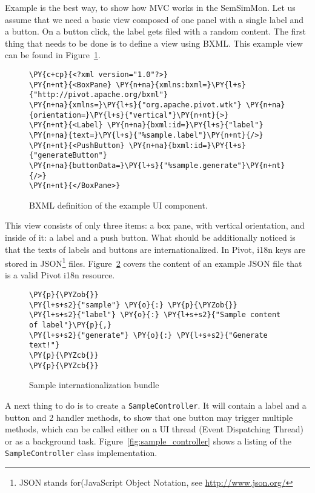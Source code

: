 Example is the best way, to show how MVC works in the SemSimMon. Let us assume that we need a basic view composed of one panel with a single label and a button. On a button click, the label gets filed with a random content. The first thing that needs to be done is to define a view using BXML. This example view can be found in Figure~\ref{fig:sample_view}.

\begin{figure}[ht]
\centering
\begin{Verbatim}[commandchars=\\\{\},frame=single,framerule=0.2pt] 
\PY{c+cp}{<?xml version="1.0"?>}
\PY{n+nt}{<BoxPane} \PY{n+na}{xmlns:bxml=}\PY{l+s}{"http://pivot.apache.org/bxml"}
\PY{n+na}{xmlns=}\PY{l+s}{"org.apache.pivot.wtk"} \PY{n+na}{orientation=}\PY{l+s}{"vertical"}\PY{n+nt}{>}
\PY{n+nt}{<Label} \PY{n+na}{bxml:id=}\PY{l+s}{"label"} \PY{n+na}{text=}\PY{l+s}{"%sample.label"}\PY{n+nt}{/>}
\PY{n+nt}{<PushButton} \PY{n+na}{bxml:id=}\PY{l+s}{"generateButton"}
\PY{n+na}{buttonData=}\PY{l+s}{"%sample.generate"}\PY{n+nt}{/>}
\PY{n+nt}{</BoxPane>}
\end{Verbatim} 
\caption{BXML definition of the example UI component.}
\label{fig:sample_view}
\end{figure}

This view consists of only three items: a box pane, with vertical orientation, and inside of it: a label and a push button. What should be additionally noticed is that the texts of labels and buttons are internationalized. In Pivot, i18n keys are stored in JSON\footnote{JSON stands for(JavaScript Object Notation, see \url{http://www.json.org/}} files. Figure~\ref{fig:i18n} covers the content of an example JSON file that is a valid Pivot i18n resource. 

\begin{figure}[ht]
\centering
\begin{Verbatim}[commandchars=\\\{\},frame=single,framerule=0.2pt] 
\PY{p}{\PYZob{}}
\PY{l+s+s2}{"sample"} \PY{o}{:} \PY{p}{\PYZob{}}
\PY{l+s+s2}{"label"} \PY{o}{:} \PY{l+s+s2}{"Sample content of label"}\PY{p}{,}
\PY{l+s+s2}{"generate"} \PY{o}{:} \PY{l+s+s2}{"Generate text!"}
\PY{p}{\PYZcb{}}
\PY{p}{\PYZcb{}}
\end{Verbatim} 
\caption{Sample internationalization bundle}
\label{fig:i18n}
\end{figure}

A next thing to do is to create a \texttt{SampleController}. It will contain a label and a button and 2 handler methods, to show that one button may trigger multiple methods, which can be called either on a UI thread (Event Dispatching Thread) or as a background task. Figure~\ref{fig:sample_controller} shows a listing of the \texttt{SampleController} class implementation.

